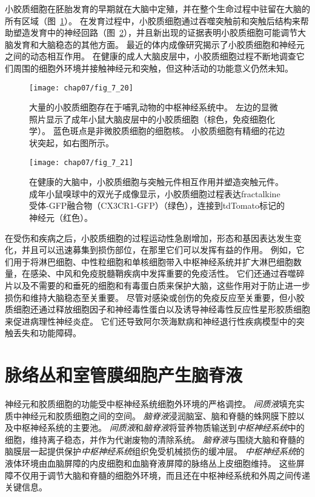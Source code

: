 小胶质细胞在胚胎发育的早期就在大脑中定殖，并在整个生命过程中驻留在大脑的所有区域（图~\ref{fig:7_20}）。
在发育过程中，小胶质细胞通过吞噬突触前和突触后结构来帮助塑造发育中的神经回路（图~\ref{fig:7_21}），并且新出现的证据表明小胶质细胞可能调节大脑发育和大脑稳态的其他方面。
最近的体内成像研究揭示了小胶质细胞和神经元之间的动态相互作用。
在健康的成人大脑皮层中，小胶质细胞过程不断地调查它们周围的细胞外环境并接触神经元和突触，但这种活动的功能意义仍然未知。


\begin{figure}[htbp]
	\centering
	\texttt{[image: chap07/fig\_7\_20]}
	\caption{大量的小胶质细胞存在于哺乳动物的中枢神经系统中。
		左边的显微照片显示了成年小鼠大脑皮层中的小胶质细胞（棕色，免疫细胞化学）。
		蓝色斑点是非微胶质细胞的细胞核。
		小胶质细胞有精细的花边状突起，如右图所示。}
	\label{fig:7_20}
\end{figure}


\begin{figure}[htbp]
	\centering
	\texttt{[image: chap07/fig\_7\_21]}
	\caption{在健康的大脑中，小胶质细胞与突触元件相互作用并塑造突触元件。
		成年小鼠嗅球中的双光子成像显示，小胶质细胞过程表达fractalkine受体-GFP融合物（CX3CR1-GFP）（绿色），连接到tdTomato标记的神经元（红色）。}
	\label{fig:7_21}
\end{figure}


在受伤和疾病之后，小胶质细胞的过程运动性急剧增加，形态和基因表达发生变化，并且可以迅速募集到损伤部位，在那里它们可以发挥有益的作用。
例如，它们用于将淋巴细胞、中性粒细胞和单核细胞带入中枢神经系统并扩大淋巴细胞数量，在感染、中风和免疫脱髓鞘疾病中发挥重要的免疫活性。
它们还通过吞噬碎片以及不需要的和垂死的细胞和有毒蛋白质来保护大脑，这些作用对于防止进一步损伤和维持大脑稳态至关重要。
尽管对感染或创伤的免疫反应至关重要，但小胶质细胞还通过释放细胞因子和神经毒性蛋白以及诱导神经毒性反应性星形胶质细胞来促进病理性神经炎症。
它们还导致阿尔茨海默病和神经退行性疾病模型中的突触丢失和功能障碍。


\section{脉络丛和室管膜细胞产生脑脊液}

神经元和胶质细胞的功能受中枢神经系统细胞外环境的严格调控。
\textit{间质液}填充实质中神经元和胶质细胞之间的空间。
\textit{脑脊液}浸润脑室、脑和脊髓的蛛网膜下腔以及中枢神经系统的主要池。
\textit{间质液}和\textit{脑脊液}将营养物质输送到\textit{中枢神经系统}中的细胞，维持离子稳态，并作为代谢废物的清除系统。
\textit{脑脊液}与围绕大脑和脊髓的脑膜层一起提供保护\textit{中枢神经系统}组织免受机械损伤的缓冲层。
\textit{中枢神经系统}的液体环境由血脑屏障的内皮细胞和血脑脊液屏障的脉络丛上皮细胞维持。
这些屏障不仅用于调节大脑和脊髓的细胞外环境，而且还在中枢神经系统和外周之间传递关键信息。


